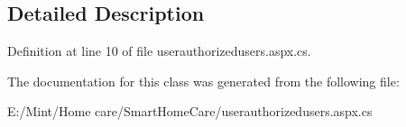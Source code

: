 \subsection{Detailed Description}


Definition at line 10 of file userauthorizedusers.\-aspx.\-cs.



The documentation for this class was generated from the following file\-:\begin{DoxyCompactItemize}
\item 
E\-:/\-Mint/\-Home care/\-Smart\-Home\-Care/userauthorizedusers.\-aspx.\-cs\end{DoxyCompactItemize}
